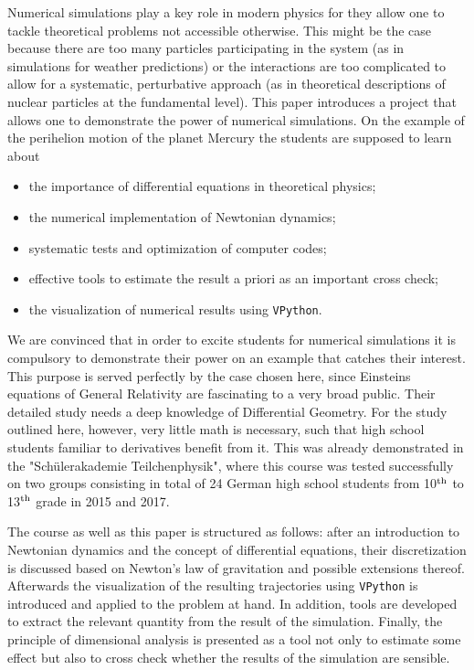 \documentclass[12pt,ngerman,american]{iopart}
\newcommand{\vpython}[0]{\texttt{VPython}}
\begin{document}
Numerical simulations play a key role in modern physics for they allow one to tackle theoretical problems not accessible otherwise. This might be the case because there are too many particles participating in the system (as in simulations for weather predictions) or the interactions are too complicated to allow for a systematic, perturbative approach (as in theoretical descriptions of nuclear particles at the fundamental level).
This paper introduces a project that allows one to demonstrate the power of numerical simulations.
On the example of the perihelion motion of the planet Mercury the students are supposed to learn about
\begin{itemize}
\item the importance of differential equations in theoretical physics;
\item the numerical implementation of Newtonian dynamics;
\item systematic tests and optimization of computer codes;
\item effective tools to estimate the result a priori as an important cross check;
\item the visualization of numerical results using \vpython{}.
\end{itemize}
We are convinced that in order to excite students for numerical simulations it is compulsory to demonstrate their power on an example that catches their interest.
This purpose is served perfectly by the case chosen here, since Einsteins equations of General Relativity are fascinating to a very broad public.
Their detailed study needs a deep knowledge of Differential Geometry. For the study outlined here, however, very little math is necessary, such that high school students familiar to derivatives benefit from it.
This was already demonstrated in the "Sch\"ulerakademie Teilchenphysik", where this course was tested successfully on two groups consisting in total of 24 German high school students from 10$^{\rm th}$ to 13$^{\rm th}$ grade in 2015 and 2017.

The course as well as this paper is structured as follows: after an introduction to Newtonian dynamics and the concept of differential equations, their
discretization is discussed based on Newton's law of gravitation and possible extensions thereof.
Afterwards the visualization of the resulting trajectories using \vpython{} is introduced and applied to the problem at hand. In addition,
 tools are developed to extract the relevant quantity from the result of the simulation.
Finally, the principle of dimensional analysis is presented as a tool not only to estimate some effect but also to cross check whether the results of the simulation are sensible.
\end{document}
